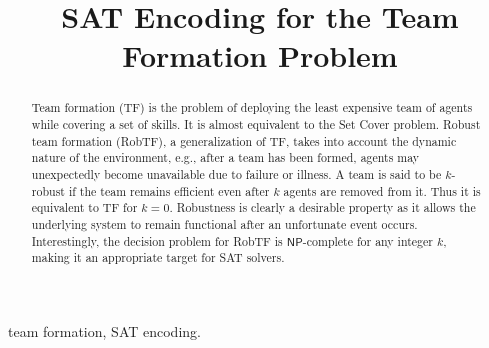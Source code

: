 \documentclass[conference]{IEEEtran}
\theoremstyle{definition}
\begin{document}
\title{SAT Encoding for the Team Formation Problem}

\author{
	\and
	\and 
	\and
}


\maketitle

\begin{abstract}
Team formation (TF) is the problem of deploying the least expensive team of agents 
while covering a set of skills. It is almost equivalent to the Set Cover problem.
Robust team formation (RobTF), a generalization of TF,
takes into account the dynamic nature of the environment, e.g., after 
a team has been formed, agents may unexpectedly become unavailable
due to failure or illness.
A team is said to be $k$-robust if the team remains efficient even after $k$ agents are removed from it.
Thus it is equivalent to TF for $k=0$.
Robustness is clearly a desirable property as it allows the underlying system to remain 
functional after an unfortunate event occurs.
Interestingly, the decision problem for RobTF is $\mathsf{NP}$-complete for any integer $k$,
making it an appropriate target for SAT solvers.
\end{abstract}

\begin{IEEEkeywords}
team formation, SAT encoding.
\end{IEEEkeywords}
\end{document}
